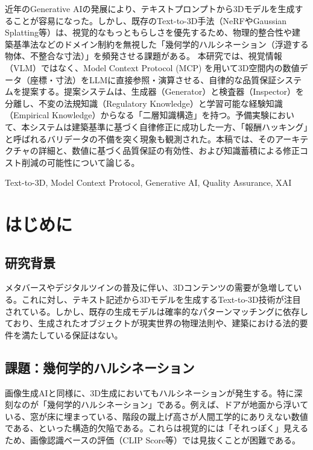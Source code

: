 \documentclass{deimj}
\begin{document}
\pagestyle{empty}

\begin{jabstract}
近年のGenerative AIの発展により、テキストプロンプトから3Dモデルを生成することが容易になった。しかし、既存のText-to-3D手法（NeRFやGaussian Splatting等）は、視覚的なもっともらしさを優先するため、物理的整合性や建築基準法などのドメイン制約を無視した「幾何学的ハルシネーション（浮遊する物体、不整合な寸法）」を頻発させる課題がある。
本研究では、視覚情報（VLM）ではなく、Model Context Protocol (MCP) を用いて3D空間内の数値データ（座標・寸法）をLLMに直接参照・演算させる、自律的な品質保証システムを提案する。提案システムは、生成器（Generator）と検査器（Inspector）を分離し、不変の法規知識（Regulatory Knowledge）と学習可能な経験知識（Empirical Knowledge）からなる「二層知識構造」を持つ。予備実験において、本システムは建築基準に基づく自律修正に成功した一方、「報酬ハッキング」と呼ばれるバリデータの不備を突く現象も観測された。本稿では、そのアーキテクチャの詳細と、数値に基づく品質保証の有効性、および知識蓄積による修正コスト削減の可能性について論じる。
\end{jabstract}

\begin{jkeyword}
Text-to-3D, Model Context Protocol, Generative AI, Quality Assurance, XAI
\end{jkeyword}

\maketitle

\section{はじめに}

\subsection{研究背景}
メタバースやデジタルツインの普及に伴い、3Dコンテンツの需要が急増している。これに対し、テキスト記述から3Dモデルを生成するText-to-3D技術が注目されている。しかし、既存の生成モデルは確率的なパターンマッチングに依存しており、生成されたオブジェクトが現実世界の物理法則や、建築における法的要件を満たしている保証はない。

\subsection{課題：幾何学的ハルシネーション}
画像生成AIと同様に、3D生成においてもハルシネーションが発生する。特に深刻なのが「幾何学的ハルシネーション」である。例えば、ドアが地面から浮いている、窓が床に埋まっている、階段の蹴上げ高さが人間工学的にありえない数値である、といった構造的欠陥である。これらは視覚的には「それっぽく」見えるため、画像認識ベースの評価（CLIP Score等）では見抜くことが困難である。
\end{document}
